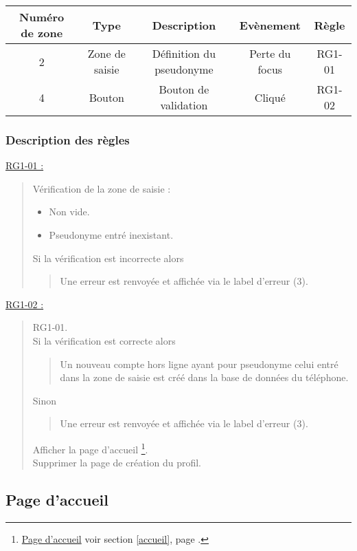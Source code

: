 \documentclass{report}
\begin{document}
			\begin{tabular}{|c|c|c|c|c|} \hline
				Numéro de zone & Type  & Description & Evènement &	Règle \\\hline 
				2 & Zone de saisie & Définition du pseudonyme & Perte du focus & RG1-01 \\\hline
				4 & Bouton         & Bouton de validation     & Cliqué & RG1-02 \\\hline
			\end{tabular}

		\subsubsection{Description des règles}
		
		\underline{RG1-01 :}
			\begin{quote}
				Vérification de la zone de saisie :
				\begin{itemize}
				  \item Non vide.
				  \item Pseudonyme entré inexistant.
				\end{itemize}
				Si la vérification est incorrecte alors
				\begin{quote}
					Une erreur est renvoyée et affichée via le label d'erreur (3).
				\end{quote}
			\end{quote}
			
		\underline{RG1-02 :}
			\begin{quote}
				RG1-01.\\
				Si la vérification est correcte alors
				\begin{quote}
					Un nouveau compte hors ligne ayant pour pseudonyme celui
					entré dans la zone de saisie est créé dans la base de
					données du téléphone.
				\end{quote}				
				Sinon
				\begin{quote}
					Une erreur est renvoyée et affichée via le label d'erreur (3).
				\end{quote}
				Afficher la page d'accueil%
					\footnote[1]{
						\hyperlink{Page d'accueil}{Page d'accueil}
						\og voir section \ref{accueil}, page \pageref{accueil}.\fg
					}.\\
				Supprimer la page de création du profil.
			\end{quote}
	
\newpage

	\subsection{Page d'accueil}
		\hypertarget{Page d'accueil}{}
		\label{accueil}
\end{document}
